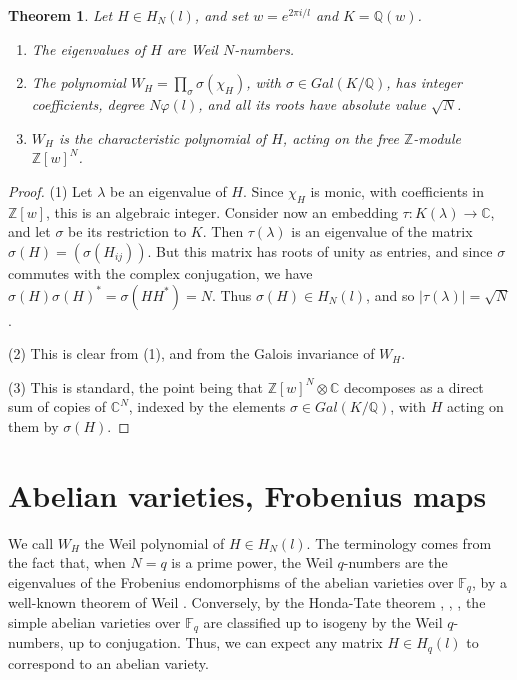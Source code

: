 \documentclass[11pt]{amsart}
\newtheorem{theorem}{Theorem}[section]
\theoremstyle{definition}
\begin{document}
\begin{theorem}\label{tweil}
Let $H\in H_N(l)$, and set $w=e^{2\pi i/l}$ and $K=\mathbb Q(w)$.
\begin{enumerate}
\item The eigenvalues of $H$ are Weil $N$-numbers.

\item The polynomial $W_H=\prod_\sigma\sigma(\chi_H)$, with $\sigma\in Gal(K/\mathbb Q)$, has integer coefficients, degree $N\varphi(l)$, and all its roots have absolute value $\sqrt{N}$.

\item $W_H$ is the characteristic polynomial of $H$, acting on the free $\mathbb Z$-module $\mathbb Z[w]^N$.
\end{enumerate}
\end{theorem}

\begin{proof}
(1) Let $\lambda$ be an eigenvalue of $H$. Since $\chi_H$ is monic, with coefficients in $\mathbb Z[w]$, this is an algebraic integer. Consider now an embedding $\tau:K(\lambda)\to\mathbb C$, and let $\sigma$ be its restriction to $K$. Then $\tau(\lambda)$ is an eigenvalue of the matrix $\sigma(H)=(\sigma(H_{ij}))$. But this matrix has roots of unity as entries, and since $\sigma$ commutes with the complex conjugation, we have $\sigma(H)\sigma(H)^*=\sigma(HH^*)=N$. Thus $\sigma(H)\in H_N(l)$, and so $|\tau(\lambda)|=\sqrt{N}$.

\medskip

(2) This is clear from (1), and from the Galois invariance of $W_H$.

\medskip

(3) This is standard, the point being that $\mathbb Z[w]^N\otimes\mathbb C$ decomposes as a direct sum of copies of $\mathbb C^N$, indexed by the elements $\sigma\in Gal(K/\mathbb Q)$, with $H$ acting on them by $\sigma(H)$.
\end{proof}

\section{Abelian varieties, Frobenius maps}

We call $W_H$ the Weil polynomial of $H\in H_N(l)$. The terminology comes from the fact that, when $N=q$ is a prime power, the Weil $q$-numbers are the eigenvalues of the Frobenius endomorphisms of the abelian varieties over $\mathbb F_q$, by a well-known theorem of Weil \cite{we2}. Conversely, by the Honda-Tate theorem \cite{hon}, \cite{ta1}, \cite{ta2}, the simple abelian varieties over $\mathbb F_q$ are classified up to isogeny by the Weil $q$-numbers, up to conjugation. Thus, we can expect any matrix $H\in H_q(l)$ to correspond to an abelian variety.
\end{document}

